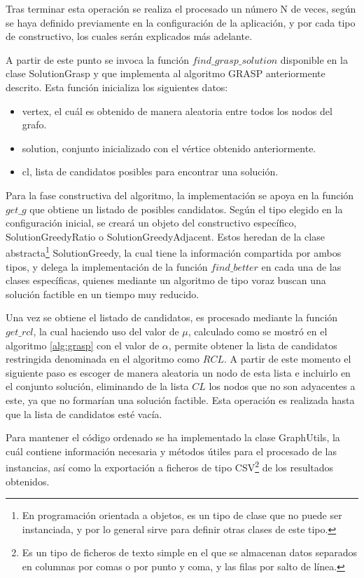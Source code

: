 Tras terminar esta operación se realiza el procesado un número N de veces, según se haya definido previamente en la configuración de la aplicación, y por cada tipo de constructivo, los cuales serán explicados más adelante.

A partir de este punto se invoca la función $find\_grasp\_solution$ disponible en la clase SolutionGrasp y que implementa al algoritmo \gls{GRASP} anteriormente descrito. Esta función inicializa los siguientes datos:
\begin{itemize}
	\item vertex, el cuál es obtenido de manera aleatoria entre todos los nodos del grafo.
	\item solution, conjunto inicializado con el vértice obtenido anteriormente.
	\item cl, lista de candidatos posibles para encontrar una solución.
\end{itemize}

Para la fase constructiva del algoritmo, la implementación se apoya en la función $get\_g$ que obtiene un listado de posibles candidatos. Según el tipo elegido en la configuración inicial, se creará un objeto del constructivo específico, SolutionGreedyRatio o SolutionGreedyAdjacent. Estos heredan de la clase abstracta\footnote{En programación orientada a objetos, es un tipo de clase que no puede ser instanciada, y por lo general sirve para definir otras clases de este tipo.} SolutionGreedy, la cual tiene la información compartida por ambos tipos, y delega la implementación de la función $find\_better$ en cada una de las clases específicas, quienes mediante un algoritmo de tipo voraz buscan una solución factible en un tiempo muy reducido.

Una vez se obtiene el listado de candidatos, es procesado mediante la función $get\_rcl$, la cual haciendo uso del valor de $\mu$, calculado como se mostró en el algoritmo \ref{alg:grasp} con el valor de $\alpha$, permite obtener la lista de candidatos restringida denominada en el algoritmo como $RCL$. A partir de este momento el siguiente paso es escoger de manera aleatoria un nodo de esta lista e incluirlo en el conjunto solución, eliminando de la lista $CL$ los nodos que no son adyacentes a este, ya que no formarían una solución factible. Esta operación es realizada hasta que la lista de candidatos esté vacía.

Para mantener el código ordenado se ha implementado la clase GraphUtils, la cuál contiene información necesaria y métodos útiles para el procesado de las instancias, así como la exportación a ficheros de tipo CSV\footnote{Es un tipo de ficheros de texto simple en el que se almacenan datos separados en columnas por comas o por punto y coma, y las filas por salto de línea.} de los resultados obtenidos.

